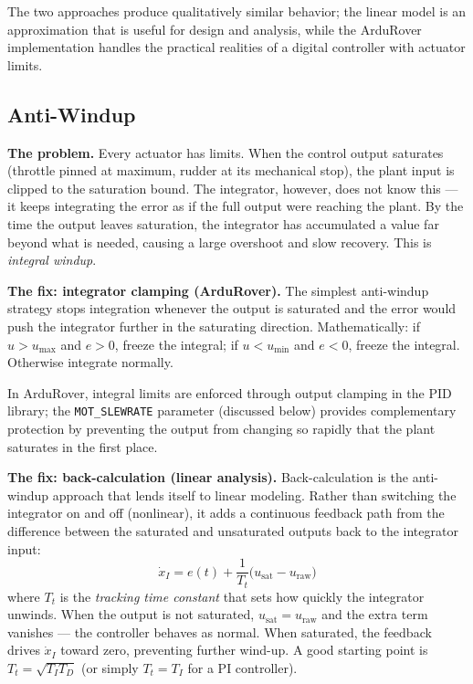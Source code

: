 \documentclass[../../book.tex]{subfiles}
\begin{document}
The two approaches produce qualitatively similar behavior; the linear model
is an approximation that is useful for design and analysis, while the ArduRover
implementation handles the practical realities of a digital controller with
actuator limits.

\subsection{Anti-Windup}

\textbf{The problem.}  Every actuator has limits.  When the control output
saturates (throttle pinned at maximum, rudder at its mechanical stop), the
plant input is clipped to the saturation bound.  The integrator, however,
does not know this --- it keeps integrating the error as if the full output
were reaching the plant.  By the time the output leaves saturation, the
integrator has accumulated a value far beyond what is needed, causing a
large overshoot and slow recovery.  This is \emph{integral windup}.

\textbf{The fix: integrator clamping (ArduRover).}
The simplest anti-windup strategy stops integration whenever the output is
saturated and the error would push the integrator further in the saturating
direction.  Mathematically: if $u > u_\mathrm{max}$ and $e > 0$, freeze the
integral; if $u < u_\mathrm{min}$ and $e < 0$, freeze the integral.
Otherwise integrate normally.


In ArduRover, integral limits are enforced through output clamping in the PID
library; the \texttt{MOT\_SLEWRATE} parameter (discussed below) provides
complementary protection by preventing the output from changing so rapidly
that the plant saturates in the first place.

\textbf{The fix: back-calculation (linear analysis).}
Back-calculation is the anti-windup approach that lends itself to linear
modeling.  Rather than switching the integrator on and off (nonlinear), it
adds a continuous feedback path from the difference between the saturated
and unsaturated outputs back to the integrator input:
\begin{equation}
  \dot{x}_I = e(t) + \frac{1}{T_t}\bigl(u_\mathrm{sat} - u_\mathrm{raw}\bigr)
  \label{eq:backcalc}
\end{equation}
where $T_t$ is the \emph{tracking time constant} that sets how quickly the
integrator unwinds.  When the output is not saturated, $u_\mathrm{sat} =
u_\mathrm{raw}$ and the extra term vanishes --- the controller behaves as
normal.  When saturated, the feedback drives $\dot{x}_I$ toward zero,
preventing further wind-up.  A good starting point is $T_t = \sqrt{T_I T_D}$
(or simply $T_t = T_I$ for a PI controller).
\end{document}
